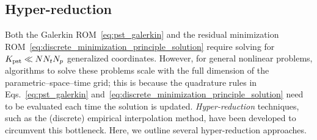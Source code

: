 \documentclass[3p,computermodern,10pt]{elsarticle}
\begin{document}
%
\subsection{Hyper-reduction}
Both the Galerkin ROM~\eqref{eq:pst_galerkin} and the residual minimization ROM~\eqref{eq:discrete_minimization_principle_solution} require solving for $K_{\text{pst}} \ll N N_t N_p$ generalized coordinates. However, for general nonlinear problems, algorithms to solve these problems scale with the full dimension of the parametric--space--time grid; this is because the quadrature rules in Eqs.~\eqref{eq:pst_galerkin} and~\eqref{eq:discrete_minimization_principle_solution} need to be evaluated each time the solution is updated. \textit{Hyper-reduction} techniques, such as the (discrete) empirical interpolation method, have been developed to circumvent this bottleneck. Here, we outline several hyper-reduction approaches. 

\end{document}
